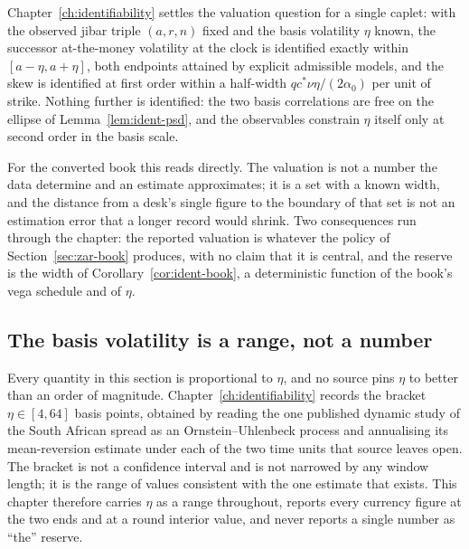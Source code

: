 \documentclass[../../../main.tex]{subfiles}
\begin{document}
Chapter~\ref{ch:identifiability} settles the valuation question for a single caplet: with the observed \gls{jibar} triple $(a,r,n)$ fixed and the basis volatility $\eta$ known, the successor at-the-money volatility at the clock is identified exactly within $[a-\eta,a+\eta]$, both endpoints attained by explicit admissible models, and the skew is identified at first order within a half-width $q c^*\nu\eta/(2\alpha_0)$ per unit of strike. Nothing further is identified: the two basis correlations are free on the ellipse of Lemma~\ref{lem:ident-psd}, and the observables constrain $\eta$ itself only at second order in the basis scale.

For the converted book this reads directly. The valuation is not a number the data determine and an estimate approximates; it is a set with a known width, and the distance from a desk's single figure to the boundary of that set is not an estimation error that a longer record would shrink. Two consequences run through the chapter: the reported valuation is whatever the policy of Section~\ref{sec:zar-book} produces, with no claim that it is central, and the reserve is the width of Corollary~\ref{cor:ident-book}, a deterministic function of the book's vega schedule and of $\eta$.

\subsection{The basis volatility is a range, not a number}

Every quantity in this section is proportional to $\eta$, and no source pins $\eta$ to better than an order of magnitude. Chapter~\ref{ch:identifiability} records the bracket $\eta\in[4,64]$ basis points, obtained by reading the one published dynamic study of the South African spread \citep[Sec.~3, p.~5 and Sec.~5.1, Table~4]{alfeus2026} as an Ornstein--Uhlenbeck process and annualising its mean-reversion estimate under each of the two time units that source leaves open. The bracket is not a confidence interval and is not narrowed by any window length; it is the range of values consistent with the one estimate that exists. This chapter therefore carries $\eta$ as a range throughout, reports every currency figure at the two ends and at a round interior value, and never reports a single number as ``the'' reserve.
\end{document}
